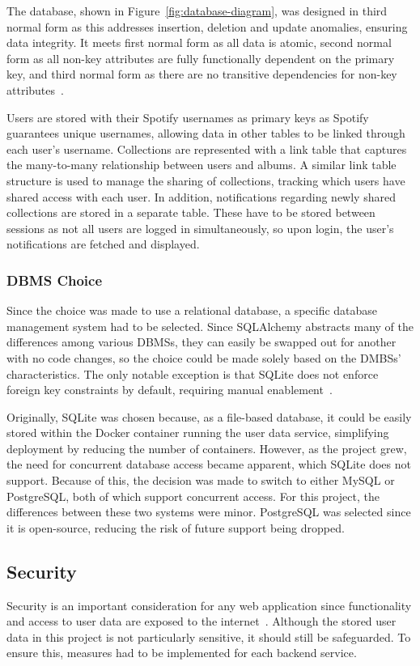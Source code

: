 The database, shown in Figure~\ref{fig:database-diagram}, was designed in third normal form as this addresses insertion, deletion and update anomalies, ensuring data integrity. It meets first normal form as all data is atomic, second normal form as all non-key attributes are fully functionally dependent on the primary key, and third normal form as there are no transitive dependencies for non-key attributes~\cite{10.1145/320493.320489}.

Users are stored with their Spotify usernames as primary keys as Spotify guarantees unique usernames, allowing data in other tables to be linked through each user's username. Collections are represented with a link table that captures the many-to-many relationship between users and albums. A similar link table structure is used to manage the sharing of collections, tracking which users have shared access with each user. In addition, notifications regarding newly shared collections are stored in a separate table. These have to be stored between sessions as not all users are logged in simultaneously, so upon login, the user's notifications are fetched and displayed.

\subsubsection{DBMS Choice}
Since the choice was made to use a relational database, a specific database management system had to be selected. Since SQLAlchemy abstracts many of the differences among various DBMSs, they can easily be swapped out for another with no code changes, so the choice could be made solely based on the DMBSs' characteristics. The only notable exception is that SQLite does not enforce foreign key constraints by default, requiring manual enablement~\cite{SQLiteForeignKeys}.

Originally, SQLite was chosen because, as a file-based database, it could be easily stored within the Docker container running the user data service, simplifying deployment by reducing the number of containers. However, as the project grew, the need for concurrent database access became apparent, which SQLite does not support. Because of this, the decision was made to switch to either MySQL or PostgreSQL, both of which support concurrent access. For this project, the differences between these two systems were minor. PostgreSQL was selected since it is open-source, reducing the risk of future support being dropped.

\subsection{Security}
Security is an important consideration for any web application since functionality and access to user data are exposed to the internet~\cite{7980348}. Although the stored user data in this project is not particularly sensitive, it should still be safeguarded. To ensure this, measures had to be implemented for each backend service.

